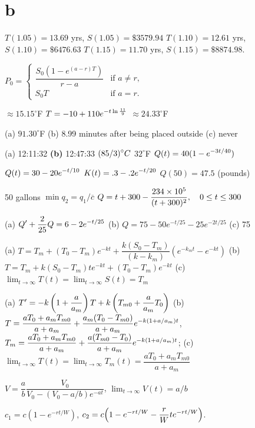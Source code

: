 \part{b}
$T(1.05)=13.69$ yrs, $S(1.05)=\$3579.94$
$T(1.10)=12.61$ yrs,
 $S(1.10)=\$6476.63$
$T(1.15)=11.70$ yrs, $S(1.15)=\$8874.98$.

$P_0=\begin{cases}
\dfrac{S_0(1-e^{(a-r)T})}{r-a}&\text{if }a\ne r,\\
S_0T&\text{if }a=r.
\end{cases}$



 $\approx15.15^\circ$F
 $\displaystyle {T= -10+110 e^{-t \ln \frac{11}{9}}}$
  $\approx 24.33^\circ$F

 (a)  $91.30^\circ$F
(b) 8.99 minutes after being placed outside (c) never

 (a) 12:11:32 {\bfseries (b) }12:47:33
  $\displaystyle {(85/3)^\circ C}$
  $32^\circ$F
  $\displaystyle {Q(t) = 40(1-e^{-3 t/40})}$

  $\displaystyle {Q(t) =30-20 e^{-t/10}}$
  $\displaystyle {K(t)=.3-.2e^{-t/20}}$
   $Q(50)=47.5$ (pounds)

  50 gallons
  $\min q_2 = q_1/\overline{c}$
 $\displaystyle {Q = t+300-\frac{234 \times 10^5}{(t+300)^2},
\quad 0 \le t \le 300}$

(a) $\displaystyle{Q'+\frac{2}{25}Q=6-2e^{-t/25}}$
(b) $Q=75-50e^{-t/25}-25e^{-2t/25}$ (c) 75

(a)
$T=T_m+(T_0-T_m)e^{-kt}+\dfrac{k(S_0-T_m)}{(k-k_m)}\left(e^{-k_mt}-e^{-kt}\right)$
 (b)
$T=T_m+k(S_0-T_m)te^{-kt}+(T_0-T_m)e^{-kt}$
 (c) $\lim_{t\to\infty}T(t)=\lim_{t\to\infty}S(t)=T_m$

 (a) $T'=\displaystyle{-k\left(1+\frac{a}{a_m}\right)T
+k\left(T_{m0}+\frac{a}{a_m}T_0\right)}$ \;
 (b) $\displaystyle{T=\frac{aT_0+a_mT_{m0}}{a+a_m}+\frac{a_m(T_0-T_{m0})}{a+a_m}e^{-k(1+a/a_m)t}}$,
 $\displaystyle{T_m=\frac{aT_0+a_mT_{m0}}{a+a_m}+\frac{a(T_{m0}-T_0)}{a+a_m}e^{-k(1+a/a_m)t}}$;
(c) $\lim_{t\to\infty}T(t)=
 \lim_{t\to\infty}T_m(t) =\dfrac{aT_0+a_mT_{m0}}{a+a_m}$

$V=\dfrac{a}{b}\dfrac{V_0}{V_0-\left(V_0-a/b
\right)e^{-at}}$, \quad $\lim_{t\to\infty}V(t)=a/b$

$c_1=c\left(1-e^{-rt/W}\right)$,
$c_2=c\displaystyle{\left(1-e^{-rt/W}-\frac{r}{W}te^{-rt/W}\right)}$.

